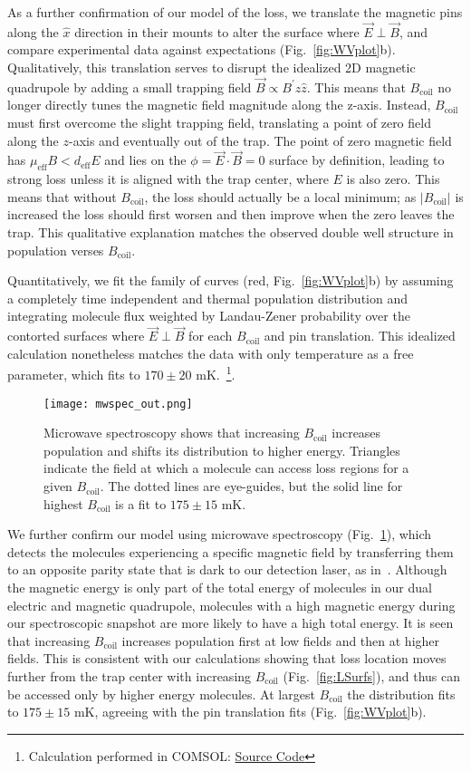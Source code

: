 \documentclass[%
 reprint,
 amsmath,amssymb,
 aps,
prl,
]{revtex4-1}
\newcommand{\bcl}{{$B_\text{coil}$}}
\newcommand{\epb}{{$\vec{E}\!\perp\!\vec{B}$}}
\begin{document}
As a further confirmation of our model of the loss, we translate the magnetic pins along the $\hat{x}$ direction in their mounts to alter the surface where \epb{}, and compare experimental data against expectations (Fig.~\ref{fig:WVplot}b). 
Qualitatively, this translation serves to disrupt the idealized 2D magnetic quadrupole by adding a small trapping field $\vec{B}\propto B^\prime z\hat{z}$. 
This means that \bcl{} no longer directly tunes the magnetic field magnitude along the z-axis. 
Instead, \bcl{} must first overcome the slight trapping field, translating a point of zero field along the $z$-axis and eventually out of the trap. The point of zero magnetic field has $\mu_\text{eff}B<d_\text{eff}E$ and lies on the $\phi=\vec{E}\cdot\vec{B}=0$ surface by definition, leading to strong loss unless it is aligned with the trap center, where $E$ is also zero. 
This means that without \bcl{}, the loss should actually be a local minimum; as $|B_\text{coil}|$ is increased the loss should first worsen and then improve when the zero leaves the trap. 
This qualitative explanation matches the observed double well structure in population verses \bcl.

Quantitatively, we fit the family of curves (red, Fig.~\ref{fig:WVplot}b) by assuming a completely time independent and thermal population distribution and integrating molecule flux weighted by Landau-Zener probability over the contorted surfaces where \epb{} for each \bcl{} and pin translation.
This idealized calculation nonetheless matches the data with only temperature as a free parameter, which fits to $170\pm20\text{ mK}$.~\footnote{Calculation performed in COMSOL: \href{https://github.com/dreens/spin-flip-integration/}{Source Code}}.

\begin{figure}[tb]
\texttt{[image: mwspec\_out.png]}%
\caption{
Microwave spectroscopy shows that increasing \bcl{} increases population and shifts its distribution to higher energy. 
Triangles indicate the field at which a molecule can access loss regions for a given \bcl. 
The dotted lines are eye-guides, but the solid line for highest \bcl{} is a fit to $175\pm15\text{ mK}$.
\label{fig:spec}}
\end{figure}

We further confirm our model using microwave spectroscopy (Fig.~\ref{fig:spec}), which detects the molecules experiencing a specific magnetic field by transferring them to an opposite parity state that is dark to our detection laser, as in~\cite{Stuhl2012evap}.
Although the magnetic energy is only part of the total energy of molecules in our dual electric and magnetic quadrupole, molecules with a high magnetic energy during our spectroscopic snapshot are more likely to have a high total energy. 
It is seen that increasing \bcl{} increases population first at low fields and then at higher fields. 
This is consistent with our calculations showing that loss location moves further from the trap center with increasing \bcl{} (Fig.~\ref{fig:LSurfs}), and thus can be accessed only by higher energy molecules. 
At largest \bcl{} the distribution fits to $175\pm15\text{ mK}$, agreeing with the pin translation fits (Fig.~\ref{fig:WVplot}b).
\end{document}
